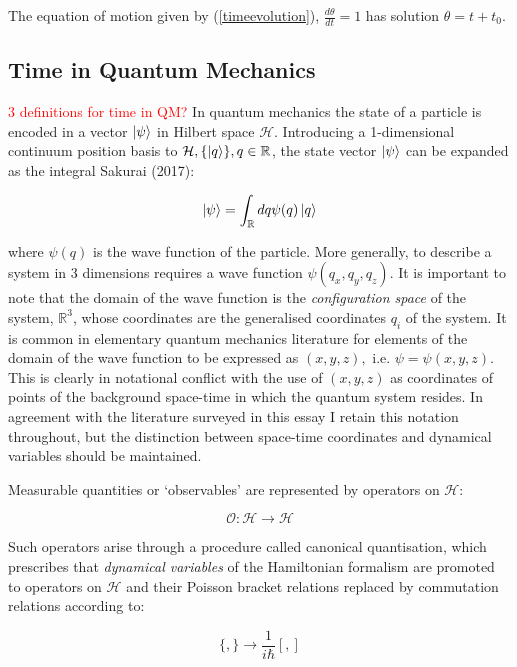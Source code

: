 \documentclass{article}
\begin{document}
\noindent The equation of motion given by (\ref{timeevolution}), $\frac{d\theta}{dt}=1$ has solution $\theta=t+t_0$.

\subsection{Time in Quantum Mechanics}
\textcolor{red}{3 definitions for time in QM?}
In quantum mechanics the state of a particle is encoded in a vector $\ket{\psi}$ in Hilbert space $\mathcal{H}$. Introducing a 1-dimensional continuum position basis to $\mathcal{H}, \{\ket{q}\}, q \in \mathbb{R}$, the state vector $\ket{\psi}$ can be expanded as the integral Sakurai (2017):

\begin{equation}
	\ket{\psi} = \int_{\mathbb{R}}dq\psi(q)\ket{q}
\end{equation}

\noindent where $\psi(q)$ is the wave function of the particle. More generally, to describe a system in 3 dimensions requires a wave function $\psi(q_x,q_y,q_z)$. It is important to note that the domain of the wave function is the \textit{configuration space} of the system, $\mathbb{R}^3$, whose coordinates are the generalised coordinates $q_i$ of the system. It is common in elementary quantum mechanics literature for elements of the domain of the wave function to be expressed as $(x,y,z), \text{ i.e. } \psi = \psi(x,y,z)$. This is clearly in notational conflict with the use of $(x,y,z)$ as coordinates of points of the background space-time in which the quantum system resides. In agreement with the literature surveyed in this essay I retain this notation throughout, but the distinction between space-time coordinates and dynamical variables should be maintained.

Measurable quantities or `observables' are represented by operators on $\mathcal{H}$:

\begin{equation}
	\mathcal{O}: \mathcal{H} \rightarrow \mathcal{H}
\end{equation}

\noindent Such operators arise through a procedure called canonical quantisation, which prescribes that \textit{dynamical variables} of the Hamiltonian formalism are promoted to operators on $\mathcal{H}$ and their Poisson bracket relations replaced by commutation relations according to:

\begin{equation}
\{,\} \rightarrow \frac{1}{i\hbar}[,]
\end{equation}
\end{document}
